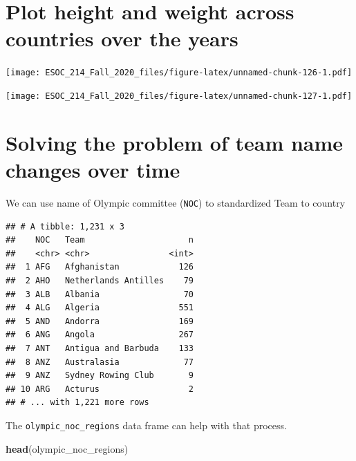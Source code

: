 \documentclass[
]{book}
\newenvironment{Shaded}{\begin{snugshade}}{\end{snugshade}}
\newcommand{\KeywordTok}[1]{\textcolor[rgb]{0.13,0.29,0.53}{\textbf{#1}}}
\newcommand{\NormalTok}[1]{#1}
\newcommand{\OperatorTok}[1]{\textcolor[rgb]{0.81,0.36,0.00}{\textbf{#1}}}
\newcommand{\StringTok}[1]{\textcolor[rgb]{0.31,0.60,0.02}{#1}}
\begin{document}
\hypertarget{plot-height-and-weight-across-countries-over-the-years}{%
\section{Plot height and weight across countries over the years}\label{plot-height-and-weight-across-countries-over-the-years}}

\texttt{[image: ESOC\_214\_Fall\_2020\_files/figure-latex/unnamed-chunk-126-1.pdf]}

\texttt{[image: ESOC\_214\_Fall\_2020\_files/figure-latex/unnamed-chunk-127-1.pdf]}

\hypertarget{solving-the-problem-of-team-name-changes-over-time}{%
\section{Solving the problem of team name changes over time}\label{solving-the-problem-of-team-name-changes-over-time}}

We can use name of Olympic committee (\texttt{NOC}) to standardized Team to country

\begin{Shaded}
\end{Shaded}

\begin{verbatim}
## # A tibble: 1,231 x 3
##    NOC   Team                     n
##    <chr> <chr>                <int>
##  1 AFG   Afghanistan            126
##  2 AHO   Netherlands Antilles    79
##  3 ALB   Albania                 70
##  4 ALG   Algeria                551
##  5 AND   Andorra                169
##  6 ANG   Angola                 267
##  7 ANT   Antigua and Barbuda    133
##  8 ANZ   Australasia             77
##  9 ANZ   Sydney Rowing Club       9
## 10 ARG   Acturus                  2
## # ... with 1,221 more rows
\end{verbatim}

The \texttt{olympic\_noc\_regions} data frame can help with that process.

\begin{Shaded}
\begin{Highlighting}[]
\KeywordTok{head}\NormalTok{(olympic_noc_regions)}
\end{Highlighting}
\end{Shaded}
\end{document}
